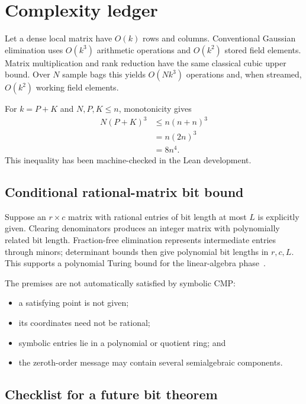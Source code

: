 \section{Complexity ledger}
\label{app:complexity}

Let a dense local matrix have \(O(k)\) rows and columns.  Conventional Gaussian
elimination uses \(O(k^3)\) arithmetic operations and \(O(k^2)\) stored field
elements.  Matrix multiplication and rank reduction have the same classical
cubic upper bound.  Over \(N\) sample bags this yields
\(O(Nk^3)\) operations and, when streamed, \(O(k^2)\) working field elements.

For \(k=P+K\) and \(N,P,K\le n\), monotonicity gives
\begin{align}
 N(P+K)^3
 &\le n(n+n)^3\\
 &=n(2n)^3\\
 &=8n^4.
\end{align}
This inequality has been machine-checked in the Lean development.

\subsection{Conditional rational-matrix bit bound}

Suppose an \(r\times c\) matrix with rational entries of bit length at most
\(L\) is explicitly given.  Clearing denominators produces an integer matrix
with polynomially related bit length.  Fraction-free elimination represents
intermediate entries through minors; determinant bounds then give polynomial
bit lengths in \(r,c,L\).  This supports a polynomial Turing bound for the
linear-algebra phase~\cite{Bareiss1968}.

The premises are not automatically satisfied by symbolic CMP:
\begin{itemize}
  \item a satisfying point is not given;
  \item its coordinates need not be rational;
  \item symbolic entries lie in a polynomial or quotient ring; and
  \item the zeroth-order message may contain several semialgebraic components.
\end{itemize}

\subsection{Checklist for a future bit theorem}

